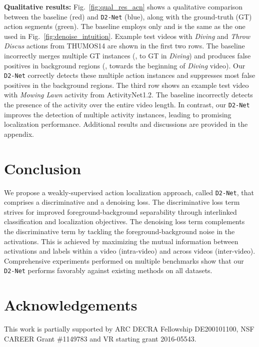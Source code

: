 \documentclass[10pt,twocolumn,letterpaper]{article}
\def\proposed{\texttt{D2-Net}{}}
\begin{document}
\noindent\textbf{Qualitative results:}
Fig.~\ref{fig:qual_res_acn} shows a qualitative comparison between the baseline (red) and \proposed{} (blue), along with the ground-truth (GT) action segments (green). 
The baseline employs only  and is the same as the one used in Fig.~\ref{fig:denoise_intuition}. Example test videos with \textit{Diving} and \textit{Throw Discus} actions from THUMOS14 are shown in the first two rows. The baseline incorrectly merges multiple GT instances (\eg,  to  GT in \textit{Diving}) and produces false positives in background regions (\eg, towards the beginning of \textit{Diving} video). Our \proposed{} correctly detects these multiple action instances and suppresses most false positives in the background regions. The third row shows an example test video with \textit{Mowing Lawn} activity from ActivityNet1.2. The baseline incorrectly detects the presence of the activity over the entire video length. In contrast, our \proposed{} improves the detection of multiple activity instances, leading to promising localization performance. Additional results and discussions are provided in the appendix.





\section{Conclusion}
We propose a weakly-supervised action localization approach, called \proposed{}, that comprises a discriminative and a denoising loss. 
The discriminative loss term strives for improved foreground-background separability through interlinked classification and localization objectives. The denoising loss term complements the discriminative term by tackling the foreground-background noise in the activations. This is achieved by maximizing the mutual information between activations and labels within a video (intra-video) and across videos (inter-video). Comprehensive experiments performed on multiple benchmarks show that our \proposed{} performs favorably against existing methods on all datasets. 


\section*{Acknowledgements}
This work is partially supported by ARC DECRA Fellowship DE200101100, NSF CAREER Grant \#1149783 and VR starting grant 2016-05543.





\end{document}
